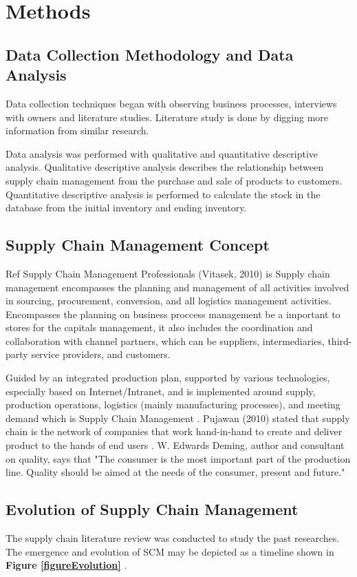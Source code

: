 \documentclass[12pt,a4paper,final]{iopart}
\begin{document}
\section{Methods}
\subsection{Data Collection Methodology and Data Analysis}
Data collection techniques began with observing business processes, interviews with owners and literature studies. Literature study is done by digging more information from similar research.

Data analysis was performed with qualitative and quantitative descriptive analysis. Qualitative descriptive analysis describes the relationship between supply chain management from the purchase and sale of products to customers. Quantitative descriptive analysis is performed to calculate the stock in the database from the initial inventory and ending inventory.

\subsection{Supply Chain Management Concept}

Ref \cite{Liu2011a} Supply Chain Management Professionals (Vitasek, 2010) is Supply chain management encompasses the planning and management of all activities involved in sourcing, procurement, conversion, and all logistics management activities. Encompasses the planning on business proccess management be a important to stores for the capitals management, it also includes the coordination and collaboration with channel partners, which can be suppliers, intermediaries, third-party service providers, and customers.

Guided by an integrated production plan, supported by various technologies, especially based on Internet/Intranet, and is implemented around supply, production operations, logistics (mainly manufacturing processes), and meeting demand which is Supply Chain Management \cite{Li2018}. Pujawan (2010) stated that supply chain is the network of companies that work hand-in-hand to create and deliver product to the hands of end users \cite{Sampouw}. W. Edwards Deming, author and consultant on quality, says that "The consumer is the most important part of the production line. Quality should be aimed at the needs of the consumer, present and future." \cite{Rusell2011}

\subsection{Evolution of Supply Chain Management}
The supply chain literature review was conducted to study the past researches. The emergence and evolution of SCM may be depicted as a timeline shown in \textbf{Figure \ref{figureEvolution}} \cite{Habib2019}.
\end{document}
